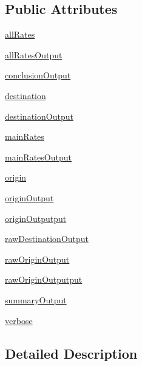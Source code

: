 \subsection*{Public Attributes}
\begin{DoxyCompactItemize}
\item 
\hyperlink{classe2e_1_1_parameters_a60eeea35185af8b13a6ea9d797a38dc7}{all\+Rates}
\item 
\hyperlink{classe2e_1_1_parameters_ac5dfd879a297879921d905de68f7febb}{all\+Rates\+Output}
\item 
\hyperlink{classe2e_1_1_parameters_ad5967b78ebf5c8778e423413053015a7}{conclusion\+Output}
\item 
\hyperlink{classe2e_1_1_parameters_ad2cdf746b8890c53a9cab6fd7df7043b}{destination}
\item 
\hyperlink{classe2e_1_1_parameters_a3b4ae5aa9b73466e51018b6f37792577}{destination\+Output}
\item 
\hyperlink{classe2e_1_1_parameters_aaa2b41d7017ab4893bbe27fa8edb7180}{main\+Rates}
\item 
\hyperlink{classe2e_1_1_parameters_a552470d8541b7caf2bb8940e32a6fe0e}{main\+Rates\+Output}
\item 
\hyperlink{classe2e_1_1_parameters_aff4d7aaa35295f7f71e546fe5554c4d9}{origin}
\item 
\hyperlink{classe2e_1_1_parameters_ab1ac2fc0ab2f3ef169b776c776cdb225}{origin\+Output}
\item 
\hyperlink{classe2e_1_1_parameters_acece0ee5caaa6322c3a337c3b7f00599}{origin\+Outputput}
\item 
\hyperlink{classe2e_1_1_parameters_a84b319098084ed505e089a600e154f6e}{raw\+Destination\+Output}
\item 
\hyperlink{classe2e_1_1_parameters_a62b586d9863422872833e34814ac51e6}{raw\+Origin\+Output}
\item 
\hyperlink{classe2e_1_1_parameters_a363d9432d8f2bdcf645fa39b81e007f3}{raw\+Origin\+Outputput}
\item 
\hyperlink{classe2e_1_1_parameters_a1f4bab2e746d2c598e20ccba0154d795}{summary\+Output}
\item 
\hyperlink{classe2e_1_1_parameters_a84d862bf507bb0325f5daf3b7e5d9ab3}{verbose}
\end{DoxyCompactItemize}


\subsection{Detailed Description}


